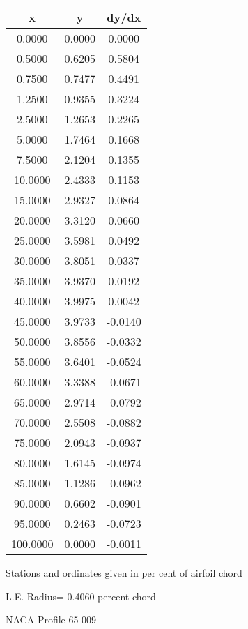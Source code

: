\documentclass[11pt]{book}
\begin{document}
 \vspace{8mm}
 \begin{tabular}{|c|c|c|} \hline 
  x  &  y  &  dy/dx \\
 \hline
0.0000 & 0.0000 & 0.0000 \\
0.5000 & 0.6205 & 0.5804 \\
0.7500 & 0.7477 & 0.4491 \\
1.2500 & 0.9355 & 0.3224 \\
2.5000 & 1.2653 & 0.2265 \\
5.0000 & 1.7464 & 0.1668 \\
7.5000 & 2.1204 & 0.1355 \\
10.0000 & 2.4333 & 0.1153 \\
15.0000 & 2.9327 & 0.0864 \\
20.0000 & 3.3120 & 0.0660 \\
25.0000 & 3.5981 & 0.0492 \\
30.0000 & 3.8051 & 0.0337 \\
35.0000 & 3.9370 & 0.0192 \\
40.0000 & 3.9975 & 0.0042 \\
45.0000 & 3.9733 & -0.0140 \\
50.0000 & 3.8556 & -0.0332 \\
55.0000 & 3.6401 & -0.0524 \\
60.0000 & 3.3388 & -0.0671 \\
65.0000 & 2.9714 & -0.0792 \\
70.0000 & 2.5508 & -0.0882 \\
75.0000 & 2.0943 & -0.0937 \\
80.0000 & 1.6145 & -0.0974 \\
85.0000 & 1.1286 & -0.0962 \\
90.0000 & 0.6602 & -0.0901 \\
95.0000 & 0.2463 & -0.0723 \\
100.0000 & 0.0000 & -0.0011 \\
 \hline
 \end{tabular}
 \vspace{8mm}


Stations and ordinates given in per cent of airfoil chord 


L.E. Radius=  0.4060 percent chord
 \newpage
  \label{p65-009}
 \begin{Large}
 NACA Profile 65-009
 \end{Large}
  
\end{document}
